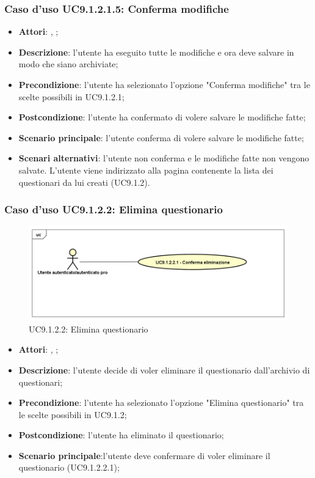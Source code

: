 					\subsubsection{Caso d'uso UC9.1.2.1.5: Conferma modifiche}
					\label{UC9.1.2.1.6}
					\begin{itemize}
						\item \textbf{Attori}: \uau, \uaupro;
						\item \textbf{Descrizione}: l'utente ha eseguito tutte le modifiche e ora deve salvare in modo che siano archiviate;
						\item \textbf{Precondizione}: l'utente ha selezionato l'opzione "Conferma modifiche" tra le scelte possibili in UC9.1.2.1;
						\item \textbf{Postcondizione}: l'utente ha confermato di volere salvare le modifiche fatte;
						\item \textbf{Scenario principale}: l'utente conferma di volere salvare le modifiche fatte;
						\item \textbf{Scenari alternativi}: l'utente non conferma e le modifiche fatte non vengono salvate. L'utente viene indirizzato alla pagina contenente la lista dei questionari da lui creati (UC9.1.2).
					\end{itemize}
										
			\subsubsection{Caso d'uso UC9.1.2.2: Elimina questionario}
			\label{UC9.1.2.2}
			\begin{figure}[h]
				\centering
			\includegraphics[scale=0.5,keepaspectratio]{UML/UC9_1_2_2.png}
				\caption{UC9.1.2.2: Elimina questionario}
			\end{figure}
			\FloatBarrier
			\begin{itemize}
				\item \textbf{Attori}: \uau, \uaupro;
				\item \textbf{Descrizione}: l'utente decide di voler eliminare il questionario dall'archivio di questionari;
				\item \textbf{Precondizione}: l'utente ha selezionato l'opzione "Elimina questionario" tra le scelte possibili in UC9.1.2;
				\item \textbf{Postcondizione}: l'utente ha eliminato il questionario;
				\item \textbf{Scenario principale}:l'utente deve confermare di voler eliminare il questionario (UC9.1.2.2.1);
			\end{itemize}
			
